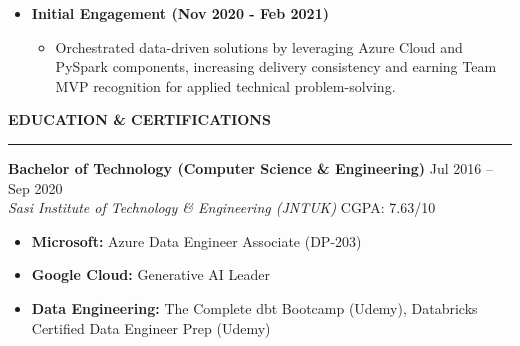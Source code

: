 \documentclass[10pt, letterpaper]{article}
\newcommand{\resumesection}[1]{
  \vspace{8pt}
  \noindent \textbf{\large \uppercase{#1}} \\
  \vspace{-8pt}
  \hrule
  \vspace{6pt}
}
\begin{document}
\begin{itemize}
    \vspace{2pt}
    \item \textbf{Initial Engagement (Nov 2020 - Feb 2021)}
    \vspace{-4pt}
    \begin{itemize}
        \setlength{\itemsep}{1pt}
        \setlength{\leftmargin}{0.25in}
        \item Orchestrated data-driven solutions by leveraging Azure Cloud and PySpark components, increasing delivery consistency and earning Team MVP recognition for applied technical problem-solving.
    \end{itemize}
\end{itemize}

\resumesection{Education \& Certifications}

\noindent \textbf{Bachelor of Technology (Computer Science \& Engineering)} \hfill Jul 2016 – Sep 2020 \\
\textit{Sasi Institute of Technology \& Engineering (JNTUK)} \hfill CGPA: 7.63/10
\vspace{4pt}

\begin{itemize}
    \setlength{\itemsep}{1pt}
    \setlength{\leftmargin}{0.25in}
    \item \textbf{Microsoft:} Azure Data Engineer Associate (DP-203)
    \item \textbf{Google Cloud:} Generative AI Leader
    \item \textbf{Data Engineering:} The Complete dbt Bootcamp (Udemy), Databricks Certified Data Engineer Prep (Udemy)
\end{itemize}
\end{document}

